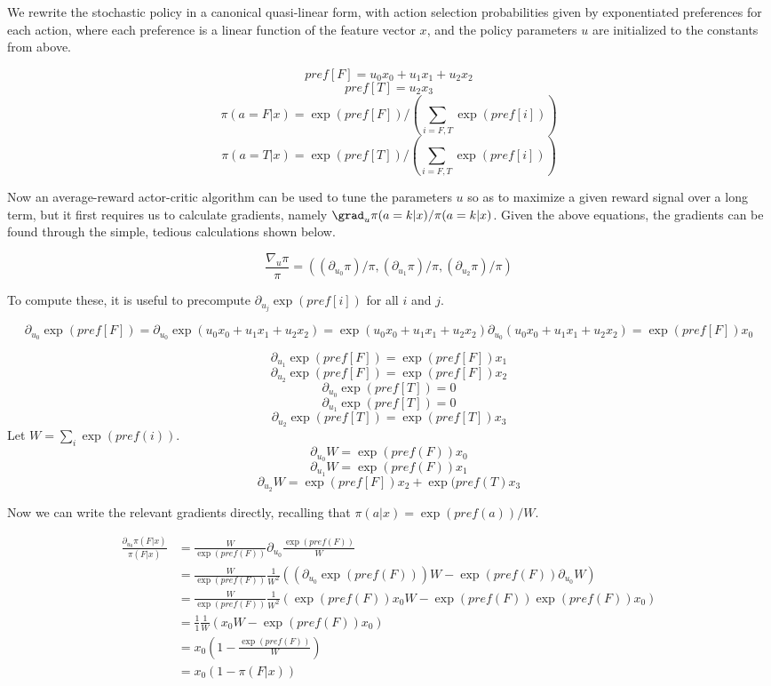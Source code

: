 \documentclass{article}
\begin{document}
We rewrite the stochastic policy in a canonical quasi-linear form, with action selection probabilities given by exponentiated preferences for each action, where each preference is a linear function of the feature vector $x$, and the policy parameters $u$ are initialized to the constants from above.

\[ pref[F] = u_0 x_0 + u_1 x_1 + u_2 x_2 \]
\[ pref[T] = u_2 x_3 \]
\[ \pi( a=F | x) = \exp(pref[F]) / (\sum_{i=F,T} \exp(pref[i])) \]
\[ \pi( a=T | x) = \exp(pref[T]) / (\sum_{i=F,T} \exp(pref[i])) \]

Now an average-reward actor-critic algorithm can be used to tune the parameters $u$ so as to maximize a given reward signal over a long term, but it first requires us to calculate gradients, namely $\grad_u \pi(a=k | x) / \pi( a=k | x)$.  Given the above equations, the gradients can be found through the simple, tedious calculations shown below.


\[ \frac{\nabla_u \pi}{\pi} = ((\partial_{u_0} \pi) / \pi , (\partial_{u_1} \pi) / \pi  ,(\partial_{u_2} \pi) / \pi ) \]

To compute these, it is useful to precompute $\partial_{u_j} \exp ( pref[i])$ for all $i$ and $j$.

\[ \partial_{u_0} \exp ( pref[F]) = \partial_{u_0} \exp( u_0 x_0 + u_1 x_1 + u_2 x_2)
= \exp( u_0 x_0 + u_1 x_1 + u_2 x_2) \partial_{u_0} ( u_0 x_0 + u_1 x_1 + u_2 x_2)
= \exp( pref[F]) x_0
\]

\[ \partial_{u_1} \exp ( pref[F]) = \exp( pref[F]) x_1 \]
\[ \partial_{u_2} \exp ( pref[F]) = \exp( pref[F]) x_2 \]
\hline
\[ \partial_{u_0} \exp ( pref[T]) = 0 \]
\[ \partial_{u_1} \exp ( pref[T]) = 0 \]
\[ \partial_{u_2} \exp ( pref[T]) = \exp( pref[T]) x_3 \] \]
\hline
Let $W = \sum_i \exp (pref(i))$.
\[ \partial_{u_0} W =  \exp (pref(F)) x_0   \]
\[ \partial_{u_1} W =  \exp (pref(F)) x_1 \]
\[ \partial_{u_2} W = \exp( pref[F]) x_2 +  \exp( pref(T) x_3  \] \]
\hline

Now we can write the relevant gradients directly, recalling that $\pi(a|x) = \exp(pref(a))/ W $.


\begin{align*}
\frac{\partial_{u_0} \pi(F|x)}{\pi(F|x)}
&= \frac{W}{\exp(pref(F))} \partial_{u_0} \frac{\exp(pref(F)) }{W}\\
&=\frac{W}{\exp(pref(F))} \frac{1}{W^2} ((\partial_{u_0} \exp(pref(F))) W -  \exp(pref(F)) \partial_{u_0} W)\\
&=\frac{W}{\exp(pref(F))} \frac{1}{W^2} (\exp(pref(F)) x_0 W -  \exp(pref(F))\exp(pref(F)) x_0 )\\
&=\frac{1}{1} \frac{1}{W} ( x_0 W -  \exp(pref(F)) x_0 )\\
&=x_0  ( 1 -  \frac{\exp(pref(F))}{W} )\\
&=x_0  ( 1 - \pi(F|x) )
\end{align*}
\end{document}

